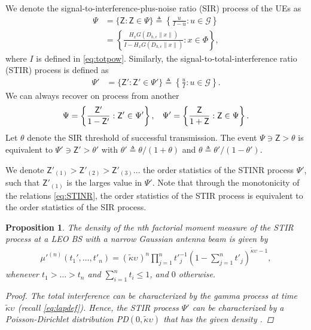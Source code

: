 \documentclass[lettersize,journal]{IEEEtran}
\newtheorem{prop}[theorem]{Proposition}
\begin{document}
 We denote the signal-to-interference-plus-noise ratio (SIR) process of the UEs as
\begin{align}
  \label{eq:SINR}
  \Psi &= \{\mathsf{Z}: \mathsf{Z} \in \Psi\} \triangleq \left\{ \frac{u}{I-u} : u \in \mathcal{G}\right\} \nonumber \\
  &=\left\{ \frac{H_x G(D_{h,\epsilon}\|x\|)}{I-H_x G(D_{h,\epsilon}\|x\|)} : x \in \Phi\right\},
\end{align}
where $I$ is defined in \eqref{eq:totpow}. Similarly, the signal-to-total-interference ratio (STIR) process is defined as
\begin{align}
  \label{eq:STINR}
  \Psi' &= \{\mathsf{Z}': \mathsf{Z}' \in \Psi'\} \triangleq \left\{ \frac{u}{I} : u \in \mathcal{G}\right\}.
\end{align}
We can always recover on process from another
\begin{equation}
  \Psi = \left\{ \frac{\mathsf{Z}'}{1- \mathsf{Z}'}: \mathsf{Z}' \in \Psi' \right\}, \hspace{0.3cm} \Psi' = \left\{ \frac{\mathsf{Z}}{1+ \mathsf{Z}}: \mathsf{Z} \in \Psi \right\}.
\end{equation}
Let $\theta$ denote the SIR threshold of successful transmission. The event $\Psi \ni\mathsf{Z}> \theta$ is equivalent to $\Psi' \ni \mathsf{Z}'> \theta'$  with $\theta' \triangleq \theta/(1+\theta)$ and $\theta \triangleq \theta'/(1-\theta')$.
    
We denote $\mathsf{Z}'_{(1)}>\mathsf{Z}'_{(2)} >\mathsf{Z}'_{(3)} \dots$ the order statistics of the STINR process $\Psi'$, such that $\mathsf{Z}'_{(1)}$ is the larges value in $\Psi'$. Note that through the monotonicity of the relations \eqref{eq:STINR}, the order statistics of the STIR process is equivalent to the order statistics of the SIR process.


\begin{prop}
  The density of the n\textit{th} factorial moment measure of the STIR process at a LEO BS with a narrow Gaussian antenna beam is given by
  \begin{align}
    \label{eq:factorialmoment}
    \mu'^{(n)}(t_1',\dots,t'_n) = (\tilde{\kappa}\upsilon_{})^n\prod_{j=1}^n{t'}_{j}^{-1}\left(1- \sum_{j=1}^nt'_j \right)^{\tilde{\kappa}\upsilon_{}-1},       
  \end{align}
  whenever $t_1>\dots >t_n$ and $\sum_{i=1}^n t_i \leq 1$, and $0$ otherwise.
  \begin{proof}
    The total interference can be characterized by the gamma process at time $\tilde{\kappa}\upsilon$ \cite[Eq. 8]{pitman1997two} (recall \eqref{eq:lapdef}). Hence, the STIR process $\Psi'$ can be characterized by a Poisson-Dirichlet distribution PD$(0,\tilde{\kappa}\upsilon)$ that has the given density \cite[Eq. 2.3]{handa2009two}.
  \end{proof}
\end{prop}
\end{document}
